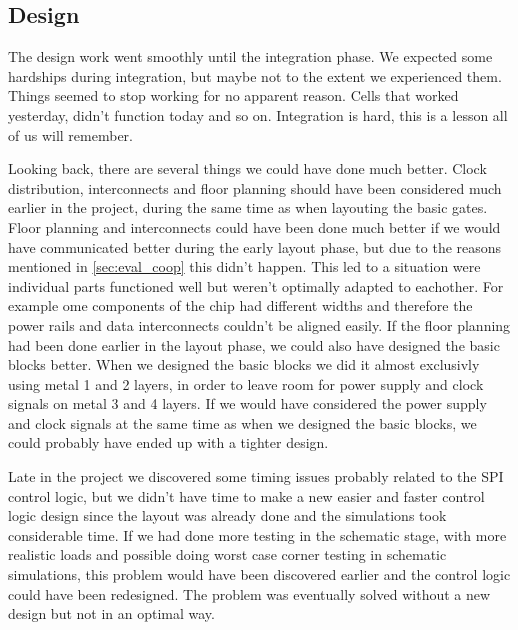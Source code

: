 \subsection{Design}
The design work went smoothly until the integration phase. We expected some hardships during integration, but maybe not to the extent we experienced them. Things seemed to stop working for no apparent reason. Cells that worked yesterday, didn't function today and so on. Integration is hard, this is a lesson all of us will remember. 

Looking back, there are several things we could have done much better. Clock distribution, interconnects and floor planning should have been considered much earlier in the project, during the same time as when layouting the basic gates. Floor planning and interconnects could have been done much better if we would have communicated better during the early layout phase, but due to the reasons mentioned in \ref{sec:eval_coop} this didn't happen. This led to a situation were individual parts functioned well but weren't optimally adapted to eachother. For example ome components of the chip had different widths and therefore the power rails and data interconnects couldn't be aligned easily. If the floor planning had been done earlier in the layout phase, we could also have designed the basic blocks better. When we designed the basic blocks we did it almost exclusivly using metal 1 and 2 layers, in order to leave room for power supply and clock signals on metal 3 and 4 layers. If we would have considered the power supply and clock signals at the same time as when we designed the basic blocks, we could probably have ended up with a tighter design.

Late in the project we discovered some timing issues probably related to the SPI control logic, but we didn't have time to make a new easier and faster control logic design since the layout was already done and the simulations took considerable time. If we had done more testing in the schematic stage, with more realistic loads and possible doing worst case corner testing in schematic simulations, this problem would have been discovered earlier and the control logic could have been redesigned. The problem was eventually solved without a new design but not in an optimal way.
